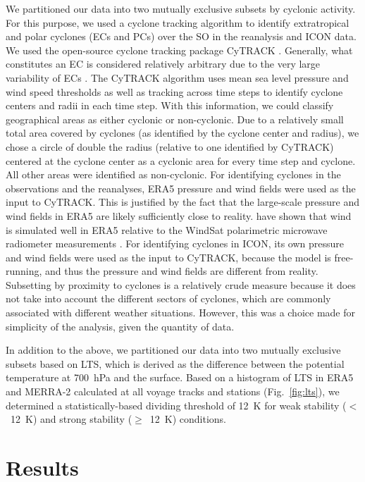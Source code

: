 \documentclass[draft]{agujournal2019}
\begin{document}
We partitioned our data into two mutually exclusive subsets by cyclonic activity. For this purpose, we used a cyclone tracking algorithm to identify extratropical and polar cyclones (ECs and PCs) over the SO in the reanalysis and ICON data. We used the open-source cyclone tracking package CyTRACK \cite{perez-alarcon2024}. Generally, what constitutes an EC is considered relatively arbitrary due to the very large variability of ECs \cite{neu2013}. The CyTRACK algorithm uses mean sea level pressure and wind speed thresholds as well as tracking across time steps to identify cyclone centers and radii in each time step. With this information, we could classify geographical areas as either cyclonic or non-cyclonic. Due to a relatively small total area covered by cyclones (as identified by the cyclone center and radius), we chose a circle of double the radius (relative to one identified by CyTRACK) centered at the cyclone center as a cyclonic area for every time step and cyclone. All other areas were identified as non-cyclonic. For identifying cyclones in the observations and the reanalyses, ERA5 pressure and wind fields were used as the input to CyTRACK. This is justified by the fact that the large-scale pressure and wind fields in ERA5 are likely sufficiently close to reality.  have shown that wind is simulated well in ERA5 relative to the WindSat polarimetric microwave radiometer measurements \cite{meissner2009}. For identifying cyclones in ICON, its own pressure and wind fields were used as the input to CyTRACK, because the model is free-running, and thus the pressure and wind fields are different from reality. Subsetting by proximity to cyclones is a relatively crude measure because it does not take into account the different sectors of cyclones, which are commonly associated with different weather situations. However, this was a choice made for simplicity of the analysis, given the quantity of data.

In addition to the above, we partitioned our data into two mutually exclusive subsets based on LTS, which is derived as the difference between the potential temperature at 700~hPa and the surface. Based on a histogram of LTS in ERA5 and MERRA-2 calculated at all voyage tracks and stations (Fig.~\ref{fig:lts}), we determined a statistically-based dividing threshold of 12~K for weak stability ($<$~12~K) and strong stability ($\geq$~12~K) conditions.

\section{Results}
\label{sec:results}
\end{document}
